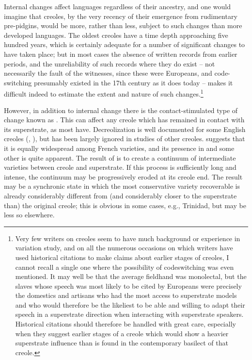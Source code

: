 Internal changes affect languages regardless of their ancestry, and one would imagine that creoles, by the very recency of their emergence from rudimentary pre-pidgins, would be more, rather than less, subject to such changes than more developed languages. The oldest creoles have a time depth approaching five hundred years, which is certainly adequate for a number of significant changes to have taken place; but in most cases the absence of written records from earlier periods, and the unreliability of such records where they do exist -- not necessarily the fault of the witnesses, since these were Europeans, and code-switching presumably existed in the 17th century as it does today -- makes it difficult indeed to estimate the extent and nature of such changes.\footnote{Very few writers on creoles seem to have much background or experience in variation study, and on all the numerous occasions on which writers have used historical citations to make claims about earlier stages of creoles, I cannot recall a single one where the possi\-bility of codeswitching was even mentioned. It may well be that the average fieldhand was monolectal, but the slaves whose speech was most likely to be cited by Europeans were precisely the domestics and artisans who had the most access to superstrate models and who would therefore be the likeliest to be able and willing to adapt their speech in a superstrate direction when interacting with superstrate speakers. Historical citations should therefore be handled with great care, especially when they suggest earlier stages of a creole which would show a heavier superstrate influence than is found in the con\-temporary basilect of that creole.}

However, in addition to internal change there is the contact-stimulated type of change known as . This can affect any creole which has remained in contact with its superstrate, as most have. Decreolization is well documented for some English creoles
(\citealt{DeCamp1971}, \citealt{Bickerton1973a,Bickerton1975}), but has been largely ignored in studies of other creoles. \citet{Valdman1973} suggests that it is equally widespread among French varieties, and its presence in  and some other  is quite apparent. The result of  is to create a continuum of intermediate varieties be\-tween creole and superstrate. If this process is sufficiently long and intense, the continuum may be progressively eroded at its creole end. The result may be a synchronic state in which the most conservative variety recoverable is already considerably different from (and con\-siderably closer to the superstrate than) the original creole; this is obvious in some cases, e.g., Trinidad, but may be less so elsewhere.

